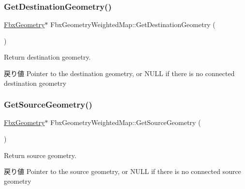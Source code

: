 \mbox{\label{class_fbx_geometry_weighted_map_ac0d7b29146fd71ceed30e13bf99f2656}} 
\subsubsection{\texorpdfstring{Get\+Destination\+Geometry()}{GetDestinationGeometry()}}
{\footnotesize\ttfamily \hyperlink{class_fbx_geometry}{Fbx\+Geometry}$\ast$ Fbx\+Geometry\+Weighted\+Map\+::\+Get\+Destination\+Geometry (\begin{DoxyParamCaption}{ }\end{DoxyParamCaption})}

Return destination geometry. \begin{DoxyReturn}{戻り値}
Pointer to the destination geometry, or {\ttfamily N\+U\+LL} if there is no connected destination geometry 
\end{DoxyReturn}
\mbox{\label{class_fbx_geometry_weighted_map_a5177720946120c17fe2003a979256e00}} 
\subsubsection{\texorpdfstring{Get\+Source\+Geometry()}{GetSourceGeometry()}}
{\footnotesize\ttfamily \hyperlink{class_fbx_geometry}{Fbx\+Geometry}$\ast$ Fbx\+Geometry\+Weighted\+Map\+::\+Get\+Source\+Geometry (\begin{DoxyParamCaption}{ }\end{DoxyParamCaption})}

Return source geometry. \begin{DoxyReturn}{戻り値}
Pointer to the source geometry, or {\ttfamily N\+U\+LL} if there is no connected source geometry 
\end{DoxyReturn}
\mbox{\label{class_fbx_geometry_weighted_map_a55d4ce89b77af065e73c32b9e5bd17e5}} 
